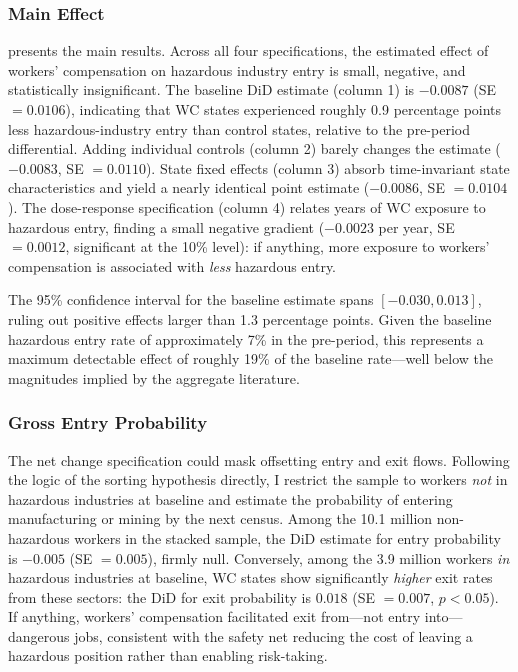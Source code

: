 \documentclass[12pt]{article}
\begin{document}
\subsubsection*{Main Effect}  presents the main results. Across all four specifications, the estimated effect of workers' compensation on hazardous industry entry is small, negative, and statistically insignificant. The baseline DiD estimate (column 1) is $-0.0087$ (SE $= 0.0106$), indicating that WC states experienced roughly 0.9 percentage points less hazardous-industry entry than control states, relative to the pre-period differential. Adding individual controls (column 2) barely changes the estimate ($-0.0083$, SE $= 0.0110$). State fixed effects (column 3) absorb time-invariant state characteristics and yield a nearly identical point estimate ($-0.0086$, SE $= 0.0104$). The dose-response specification (column 4) relates years of WC exposure to hazardous entry, finding a small negative gradient ($-0.0023$ per year, SE $= 0.0012$, significant at the 10\% level): if anything, more exposure to workers' compensation is associated with \textit{less} hazardous entry.

The 95\% confidence interval for the baseline estimate spans $[-0.030, 0.013]$, ruling out positive effects larger than 1.3 percentage points. Given the baseline hazardous entry rate of approximately 7\% in the pre-period, this represents a maximum detectable effect of roughly 19\% of the baseline rate---well below the magnitudes implied by the aggregate literature.

\subsubsection*{Gross Entry Probability} The net change specification could mask offsetting entry and exit flows. Following the logic of the sorting hypothesis directly, I restrict the sample to workers \textit{not} in hazardous industries at baseline and estimate the probability of entering manufacturing or mining by the next census. Among the 10.1 million non-hazardous workers in the stacked sample, the DiD estimate for entry probability is $-0.005$ (SE $= 0.005$), firmly null. Conversely, among the 3.9 million workers \textit{in} hazardous industries at baseline, WC states show significantly \textit{higher} exit rates from these sectors: the DiD for exit probability is $0.018$ (SE $= 0.007$, $p < 0.05$). If anything, workers' compensation facilitated exit from---not entry into---dangerous jobs, consistent with the safety net reducing the cost of leaving a hazardous position rather than enabling risk-taking.
\end{document}
